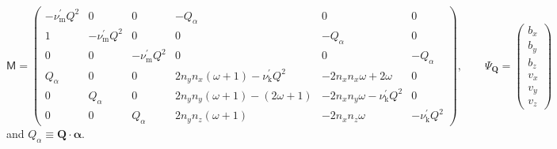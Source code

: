 \documentclass[a4paper,11pt]{article}
\begin{document}
\begin{equation}
\mathsf{M} =
\left(\begin{array}{ccc|ccc}
-\nu^\prime_\mathrm{m}Q^2 & 0 & 0 & -Q_\alpha& 0 & 0\\
1 & -\nu^\prime_\mathrm{m}Q^2 & 0 & 0 & -Q_\alpha & 0 \\
0 & 0& -\nu^\prime_\mathrm{m}Q^2  & 0 & 0 & -Q_\alpha\\
\hline
Q_\alpha& 0 & 0 & 2n_yn_x(\omega+1)-\nu^\prime_\mathrm{k}Q^2 & -2n_xn_x\omega+2\omega & 0 \\
0 & Q_\alpha & 0 &2n_yn_y(\omega+1) -(2\omega+1) & -2n_xn_y\omega -\nu^\prime_\mathrm{k}Q^2 & 0 \\
0 & 0 & Q_\alpha & 2n_yn_z(\omega+1) & -2n_xn_z \omega  & -\nu^\prime_\mathrm{k}Q^2
\end{array}\right),\qquad
\Psi_\mathbf{Q}=\left(\begin{array}{c}
            b_x\\
	    b_y\\
	    b_z\\
	    v_x\\
	    v_y\\
	    v_z
           \end{array}\right)
\end{equation}
%
and $Q_\alpha\equiv\mathbf{Q}\cdot\boldsymbol{\alpha}.$
\end{document}
